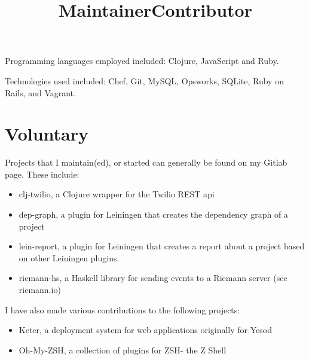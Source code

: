 \documentclass[margintitle,line]{res}
\renewcommand{\subsection}[1]{\section{\normalfont #1}}
\begin{document}
\begin{resume}
\begin{position}
 Programming languages employed included: Clojure, JavaScript and Ruby.

 Technologies used included: Chef, Git, MySQL, Opsworks, SQLite,
 Ruby on Rails, and Vagrant.
\end{position}




%
\subsection{Voluntary}

\title{Maintainer}
\begin{position}
Projects that I maintain(ed), or started can generally be found on my
Gitlab page. These include:
\begin{itemize}
\item{clj-twilio, a Clojure wrapper for the Twilio REST api}
\item{dep-graph, a plugin for Leiningen that creates the dependency
    graph of a project}
\item{lein-report, a plugin for Leiningen that creates a report about
  a project based on other Leiningen plugins.}
\item{riemann-hs, a Haskell library for sending events to a Riemann
  server (see riemann.io)}
\end{itemize}
\end{position}

\title{Contributor}
\begin{position}
I have also made various contributions to the following projects:
\begin{itemize}
\item{Keter, a deployment system for web applications originally for Yesod}
\item{Oh-My-ZSH, a collection of plugins for ZSH- the Z Shell}
\end{itemize}
\end{position}



\end{resume}
\end{document}

